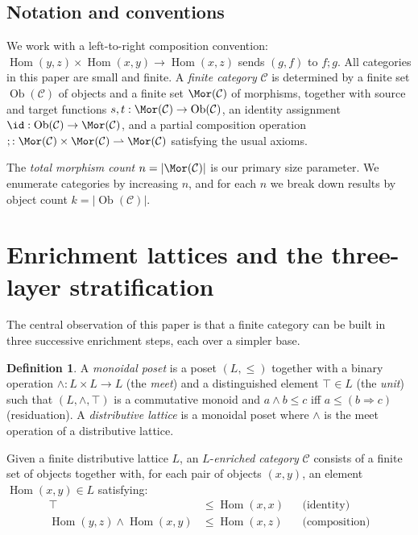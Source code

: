 \documentclass[12pt,a4paper]{amsart}
\theoremstyle{definition}
\newtheorem{definition}[theorem]{Definition}
\theoremstyle{remark}
\newcommand{\cat}{\mathcal}
\newcommand{\Ob}{\operatorname{Ob}}
\newcommand{\Hom}{\operatorname{Hom}}
\begin{document}
\subsection{Notation and conventions}

We work with a left-to-right composition convention: $\Hom(y,z) \times
\Hom(x,y) \to \Hom(x,z)$ sends $(g,f)$ to $f;g$.  All categories in this
paper are small and finite.  A \emph{finite category} $\cat{C}$ is
determined by a finite set $\Ob(\cat{C})$ of objects and a finite set
$\Mor(\cat{C})$ of morphisms, together with source and target functions
$s,t : \Mor(\cat{C}) \to \Ob(\cat{C})$, an identity assignment
$\id : \Ob(\cat{C}) \to \Mor(\cat{C})$, and a partial composition
operation $; : \Mor(\cat{C}) \times \Mor(\cat{C}) \rightharpoonup
\Mor(\cat{C})$ satisfying the usual axioms.

The \emph{total morphism count} $n = |\Mor(\cat{C})|$ is our primary size
parameter.  We enumerate categories by increasing $n$, and for each $n$ we
break down results by object count $k = |\Ob(\cat{C})|$.

\section{Enrichment lattices and the three-layer stratification}
\label{sec:enrichment}

The central observation of this paper is that a finite category can be
built in three successive enrichment steps, each over a simpler base.

\begin{definition}
  A \emph{monoidal poset} is a poset $(L, \leq)$ together with a binary
  operation $\wedge : L \times L \to L$ (the \emph{meet}) and a distinguished
  element $\top \in L$ (the \emph{unit}) such that $(L, \wedge, \top)$ is
  a commutative monoid and $a \wedge b \leq c$ iff $a \leq (b \Rightarrow c)$
  (residuation).  A \emph{distributive lattice} is a monoidal poset where
  $\wedge$ is the meet operation of a distributive lattice.
\end{definition}

Given a finite distributive lattice $L$, an $L$-\emph{enriched category}
$\cat{C}$ consists of a finite set of objects together with, for each pair
of objects $(x,y)$, an element $\Hom(x,y) \in L$ satisfying:
\begin{align*}
  \top &\leq \Hom(x,x) &&\text{(identity)} \\
  \Hom(y,z) \wedge \Hom(x,y) &\leq \Hom(x,z) &&\text{(composition)}
\end{align*}
\end{document}
